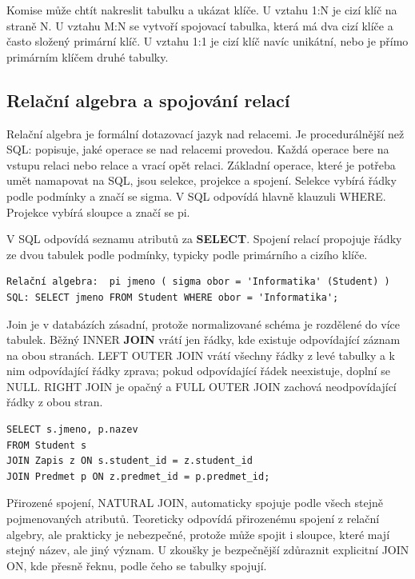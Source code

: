 Komise může chtít nakreslit tabulku a ukázat klíče. U vztahu 1:N je cizí klíč na straně N. U vztahu M:N se vytvoří spojovací tabulka, která má dva cizí klíče a často složený primární klíč. U vztahu 1:1 je cizí klíč navíc unikátní, nebo je přímo primárním klíčem druhé tabulky.

\subsection*{Relační algebra a spojování relací}

Relační algebra je formální dotazovací jazyk nad relacemi. Je procedurálnější než SQL: popisuje, jaké operace se nad relacemi provedou. Každá operace bere na vstupu relaci nebo relace a vrací opět relaci. Základní operace, které je potřeba umět namapovat na SQL, jsou selekce, projekce a spojení. Selekce vybírá řádky podle podmínky a značí se sigma. V SQL odpovídá hlavně klauzuli WHERE. Projekce vybírá sloupce a značí se pi.

V SQL odpovídá seznamu atributů za \textbf{SELECT}. Spojení relací propojuje řádky ze dvou tabulek podle podmínky, typicky podle primárního a cizího klíče.

\begin{codebox}
\small
\begin{verbatim}
Relační algebra:  pi jmeno ( sigma obor = 'Informatika' (Student) )
SQL: SELECT jmeno FROM Student WHERE obor = 'Informatika';
\end{verbatim}
\end{codebox}

Join je v databázích zásadní, protože normalizované schéma je rozdělené do více tabulek. Běžný INNER \textbf{JOIN} vrátí jen řádky, kde existuje odpovídající záznam na obou stranách. LEFT OUTER JOIN vrátí všechny řádky z levé tabulky a k nim odpovídající řádky zprava; pokud odpovídající řádek neexistuje, doplní se NULL. RIGHT JOIN je opačný a FULL OUTER JOIN zachová neodpovídající řádky z obou stran.

\begin{codebox}
\small
\begin{verbatim}
SELECT s.jmeno, p.nazev
FROM Student s
JOIN Zapis z ON s.student_id = z.student_id
JOIN Predmet p ON z.predmet_id = p.predmet_id;
\end{verbatim}
\end{codebox}

Přirozené spojení, NATURAL JOIN, automaticky spojuje podle všech stejně pojmenovaných atributů. Teoreticky odpovídá přirozenému spojení z relační algebry, ale prakticky je nebezpečné, protože může spojit i sloupce, které mají stejný název, ale jiný význam. U zkoušky je bezpečnější zdůraznit explicitní JOIN ON, kde přesně řeknu, podle čeho se tabulky spojují.

